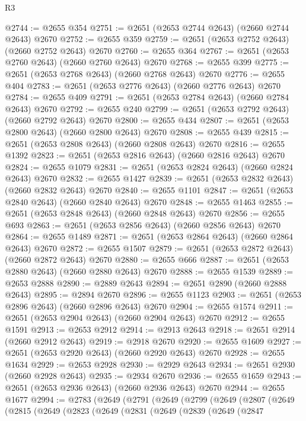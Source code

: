 \begin{lexlean}{R3}
\begin{coremodule}
@2744 := @2655 @354
@2751 := @2651 (@2653 @2744 @2643) (@2660 @2744 @2643) @2670
@2752 := @2655 @359
@2759 := @2651 (@2653 @2752 @2643) (@2660 @2752 @2643) @2670
@2760 := @2655 @364
@2767 := @2651 (@2653 @2760 @2643) (@2660 @2760 @2643) @2670
@2768 := @2655 @399
@2775 := @2651 (@2653 @2768 @2643) (@2660 @2768 @2643) @2670
@2776 := @2655 @404
@2783 := @2651 (@2653 @2776 @2643) (@2660 @2776 @2643) @2670
@2784 := @2655 @409
@2791 := @2651 (@2653 @2784 @2643) (@2660 @2784 @2643) @2670
@2792 := @2655 @240
@2799 := @2651 (@2653 @2792 @2643) (@2660 @2792 @2643) @2670
@2800 := @2655 @434
@2807 := @2651 (@2653 @2800 @2643) (@2660 @2800 @2643) @2670
@2808 := @2655 @439
@2815 := @2651 (@2653 @2808 @2643) (@2660 @2808 @2643) @2670
@2816 := @2655 @1392
@2823 := @2651 (@2653 @2816 @2643) (@2660 @2816 @2643) @2670
@2824 := @2655 @1079
@2831 := @2651 (@2653 @2824 @2643) (@2660 @2824 @2643) @2670
@2832 := @2655 @1427
@2839 := @2651 (@2653 @2832 @2643) (@2660 @2832 @2643) @2670
@2840 := @2655 @1101
@2847 := @2651 (@2653 @2840 @2643) (@2660 @2840 @2643) @2670
@2848 := @2655 @1463
@2855 := @2651 (@2653 @2848 @2643) (@2660 @2848 @2643) @2670
@2856 := @2655 @693
@2863 := @2651 (@2653 @2856 @2643) (@2660 @2856 @2643) @2670
@2864 := @2655 @1489
@2871 := @2651 (@2653 @2864 @2643) (@2660 @2864 @2643) @2670
@2872 := @2655 @1507
@2879 := @2651 (@2653 @2872 @2643) (@2660 @2872 @2643) @2670
@2880 := @2655 @666
@2887 := @2651 (@2653 @2880 @2643) (@2660 @2880 @2643) @2670
@2888 := @2655 @1539
@2889 := @2653 @2888
@2890 := @2889 @2643
@2894 := @2651 @2890 (@2660 @2888 @2643)
@2895 := @2894 @2670
@2896 := @2655 @1123
@2903 := @2651 (@2653 @2896 @2643) (@2660 @2896 @2643) @2670
@2904 := @2655 @1574
@2911 := @2651 (@2653 @2904 @2643) (@2660 @2904 @2643) @2670
@2912 := @2655 @1591
@2913 := @2653 @2912
@2914 := @2913 @2643
@2918 := @2651 @2914 (@2660 @2912 @2643)
@2919 := @2918 @2670
@2920 := @2655 @1609
@2927 := @2651 (@2653 @2920 @2643) (@2660 @2920 @2643) @2670
@2928 := @2655 @1634
@2929 := @2653 @2928
@2930 := @2929 @2643
@2934 := @2651 @2930 (@2660 @2928 @2643)
@2935 := @2934 @2670
@2936 := @2655 @1659
@2943 := @2651 (@2653 @2936 @2643) (@2660 @2936 @2643) @2670
@2944 := @2655 @1677
@2994 := @2783
    (@2649
      (@2791
        (@2649
          (@2799
            (@2649
              (@2807
                (@2649
                  (@2815
                    (@2649
                      (@2823
                        (@2649
                          (@2831
                            (@2649
                              (@2839
                                (@2649
                                  (@2847

\end{coremodule}
\end{lexlean}
